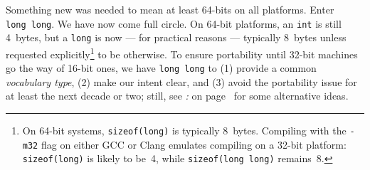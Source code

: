 Something new was needed to mean at least 64-bits on all platforms.
Enter \texttt{long}~\texttt{long}. We have now come full circle. On
64-bit platforms, an \texttt{int} is still 4~bytes, but a \texttt{long}
is now --- for practical reasons --- typically 8~bytes unless requested
explicitly{\cprotect\footnote{On 64-bit systems, \texttt{sizeof(long)}
is typically 8~bytes. Compiling with the \texttt{-m32} flag on either
GCC or Clang emulates compiling on a 32-bit platform:
\texttt{sizeof(long)} is likely to be~4, while
\texttt{sizeof(long}~\texttt{long)} remains~8.}} to be otherwise. To ensure portability until 32-bit machines go the way of 16-bit ones,
we have \texttt{long}~\texttt{long} to (1) provide a common \emph{vocabulary type}, (2)
make our intent clear, and (3) avoid the portability issue for
at least the next decade or two; still, see {\it{}: } on page~\pageref{relying-on-the-relative-sizes-of-int,-long,-and-long-long} for some alternative ideas.



